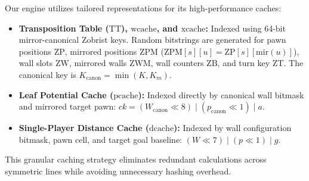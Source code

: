 Our engine utilizes tailored representations for its high-performance caches:
\begin{itemize}[leftmargin=1.5em]
    \item \textbf{Transposition Table ($\text{TT}$), $\text{wcache}$, and $\text{xcache}$:} Indexed using 64-bit mirror-canonical Zobrist keys. Random bitstrings are generated for pawn positions $\text{ZP}$, mirrored positions $\text{ZPM}$ ($\text{ZPM}[s][u] = \text{ZP}[s][\text{mir}(u)]$), wall slots $\text{ZW}$, mirrored walls $\text{ZWM}$, wall counters $\text{ZB}$, and turn key $\text{ZT}$. The canonical key is $K_{\text{canon}} = \min(K, K_m)$.
    \item \textbf{Leaf Potential Cache ($\text{pcache}$):} Indexed directly by canonical wall bitmask and mirrored target pawn: $ck = (W_{\text{canon}} \ll 8) \mid (p_{\text{canon}} \ll 1) \mid a$.
    \item \textbf{Single-Player Distance Cache ($\text{dcache}$):} Indexed by wall configuration bitmask, pawn cell, and target goal baseline: $(W \ll 7) \mid (p \ll 1) \mid g$.
\end{itemize}
This granular caching strategy eliminates redundant calculations across symmetric lines while avoiding unnecessary hashing overhead.


